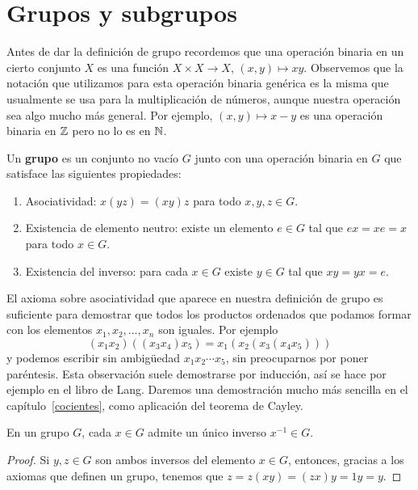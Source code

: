 \chapter{Grupos y subgrupos}
\label{grupos}

Antes de dar la definición de grupo recordemos que una operación binaria en un
cierto conjunto $X$ es una función $X\times X\to X$, $(x,y)\mapsto xy$. Observemos que la notación que utilizamos para esta operación binaria genérica es la misma que usualmente se usa para la multiplicación de números, aunque nuestra operación sea algo mucho más general. Por ejemplo, $(x,y)\mapsto x-y$ es una operación binaria en $\mathbb{Z}$ pero no lo es en $\mathbb{N}$. 

\begin{definition}
	Un \textbf{grupo} es un conjunto no vacío $G$ junto con una operación binaria 
	en $G$ que satisface las siguientes propiedades:
	\begin{enumerate}
		\item Asociatividad: $x(yz)=(xy)z$ para todo $x,y,z\in G$.
		\item Existencia de elemento neutro: existe un elemento $e\in G$ tal que $ex=xe=x$ para todo $x\in G$.
		\item Existencia del inverso: para cada $x\in G$ existe $y\in G$ tal que $xy=yx=e$. 
	\end{enumerate}
\end{definition}

El axioma sobre asociatividad que aparece en nuestra definición de grupo es
suficiente para demostrar que todos los productos ordenados que podamos formar
con los elementos $x_1,x_2,\dots,x_n$ son iguales. Por ejemplo
\[
	(x_1x_2)((x_3x_4)x_5)=x_1(x_2(x_3(x_4x_5)))
\]
y podemos escribir sin ambigüedad $x_1x_2\cdots
x_5$, sin preocuparnos por poner paréntesis. Esta observación suele demostrarse por inducción, así se hace por ejemplo en el libro de Lang. Daremos una demostración mucho más sencilla en el capítulo~\ref{cocientes}, como aplicación del teorema de Cayley. 

\begin{proposition}
	En un grupo $G$, cada $x\in G$ admite un único inverso $x^{-1}\in G$. 
\end{proposition}

\begin{proof}
	Si $y,z\in G$ son ambos inversos del elemento $x\in G$, entonces, gracias a
	los axiomas que definen un grupo, tenemos que $z=z(xy)=(zx)y=1y=y$. 
\end{proof}

